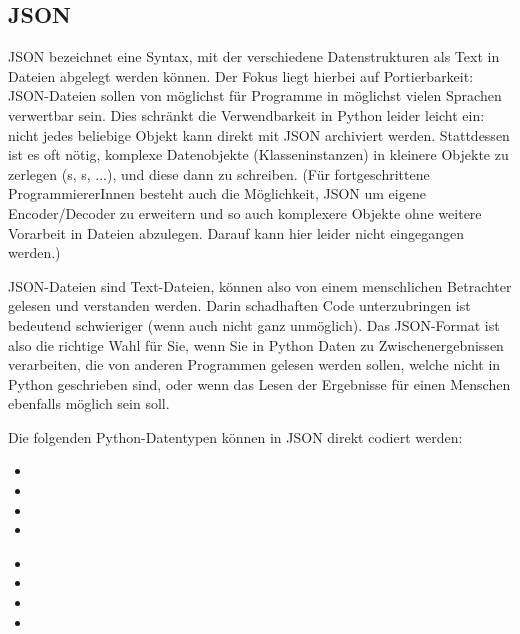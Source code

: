 \subsection{JSON}
JSON bezeichnet eine Syntax, mit der verschiedene Datenstrukturen als Text in Dateien abgelegt werden können. Der Fokus liegt hierbei auf Portierbarkeit: JSON-Dateien sollen von möglichst für Programme in möglichst vielen Sprachen verwertbar sein. Dies schränkt die Verwendbarkeit in Python leider leicht ein: nicht jedes beliebige Objekt kann direkt mit JSON archiviert werden. Stattdessen ist es oft nötig, komplexe Datenobjekte (Klasseninstanzen) in kleinere Objekte zu zerlegen (s, s, ...), und diese dann zu schreiben. (Für fortgeschrittene ProgrammiererInnen besteht auch die Möglichkeit, JSON um eigene Encoder/Decoder zu erweitern und so auch komplexere Objekte ohne weitere Vorarbeit in Dateien abzulegen. Darauf kann hier leider nicht eingegangen werden.)

JSON-Dateien sind Text-Dateien, können also von einem menschlichen Betrachter gelesen und verstanden werden. Darin schadhaften Code unterzubringen ist bedeutend schwieriger (wenn auch nicht ganz unmöglich). Das JSON-Format ist also die richtige Wahl für Sie, wenn Sie in Python Daten zu Zwischenergebnissen verarbeiten, die von anderen Programmen gelesen werden sollen, welche nicht in Python geschrieben sind, oder wenn das Lesen der Ergebnisse für einen Menschen ebenfalls möglich sein soll.

Die folgenden Python-Datentypen können in JSON direkt codiert werden:

\begin{minipage}{.49\linewidth}
\begin{itemize}
\item {}
\item {}
\item {}
\item {}
\end{itemize}
\end{minipage}
\begin{minipage}{.49\linewidth}
\begin{itemize}
\item {}
\item {}
\item {}
\item {}
\end{itemize}
\end{minipage}

